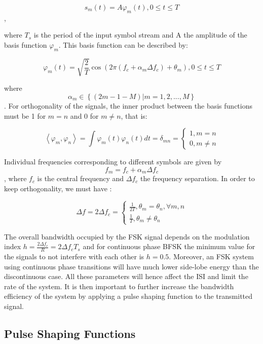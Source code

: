 \documentclass[12pt,a4paper,openright]{article}
\begin{document}
\[{s_m}(t) = A{\varphi _m}(t),0 \le t \le T\],

where $T_s$ is the period of the input symbol stream and A the amplitude of the basis function $\varphi_m$. This basis function can be described by:

\[{\varphi _m}(t) = \sqrt {\frac{2}{T}} \cos \left( {2\pi ({f_c} + {\alpha _m}\Delta {f_c}) + {\theta _m}} \right),0 \le t \le T\]


where \[{\alpha _m} \in \left\{ {(2m - 1 - M)|m = 1,2,...,M} \right\}\]. For orthogonality of the signals, the inner product between the basis functions must be 1 for $m=n$ and 0 for $m\neq n$, that is: 

\[\left\langle {\left. {{\varphi _m},{\varphi _n}} \right\rangle } \right. = \int {{\varphi _m}(t){\varphi _n}(t)dt = {\delta _{mn}} = \left\{ \begin{array}{l}
1,m = n\\
0,m \ne n
\end{array} \right.} \]


Individual frequencies corresponding to different symbols are given by \[{f_m} = {f_c} + {\alpha _m}\Delta {f_c}\], where $f_c$ is the central frequency and $\Delta f_c$ the frequency separation. In order to keep orthogonality, we must have \cite{gold}:

\[\Delta {f}= 2\Delta {f_c} = \left\{ \begin{array}{l}
\frac{1}{{2T}},{\theta _m} = {\theta _n},\forall m,n\\
\frac{1}{T},{\theta _m} \ne {\theta _n}
\end{array} \right.\]

The overall bandwidth occupied by the FSK signal depends on the modulation index $h=\frac{2\Delta {f_c}}{R}=2\Delta {f_c}T_s$ and for continuous phase BFSK the minimum value for the signals to not interfere with each other is $h=0.5$. Moreover, an FSK system using continuous phase transitions will have much lower side-lobe energy than the discontinuous case. All these parameters will hence affect the ISI and limit the rate of the system. It is then important to further increase the bandwidth efficiency of the system by applying a pulse shaping function to the transmitted signal.

\subsection{Pulse Shaping Functions}
\end{document}
